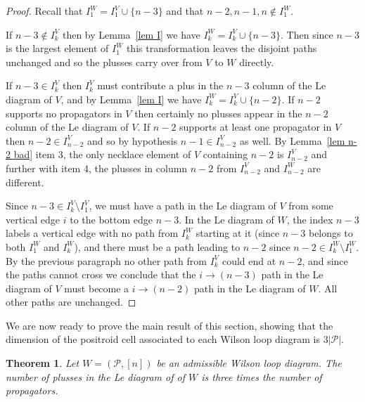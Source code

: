 \documentclass[11pt]{article}
\newcommand{\cP}{\mathcal{P}}
\newtheorem{thm}{Theorem}[section]
\theoremstyle{remark}
\theoremstyle{definition}
\begin{document}
\begin{proof}
Recall that $I_1^W = I_1^V\cup \{n-3\}$ and that $n-2,n-1,n \not\in I_1^W$.

  If $n-3\not\in I_{k}^{V}$ then by Lemma~\ref{lem I} we have $I_{k}^{W} = I_k^{V}\cup \{n-3\}$.  Then since $n-3$ is the largest element of $I_1^{W}$ this transformation leaves the disjoint paths unchanged and so the plusses carry over from $V$ to $W$ directly.

  If $n-3\in I_{k}^{V}$ then $I_k^V$ must contribute a plus in the $n-3$ column of the Le diagram of $V$, and by Lemma~\ref{lem I} we have $I_{k}^{W} = I_k^{V}\cup \{n-2\}$. If $n-2$ supports no propagators in $V$ then certainly no plusses appear in the $n-2$ column of the Le diagram of $V$. If $n-2$ supports at least one propagator in $V$ then $n-2 \in I_{n-2}^V$ and so by hypothesis $n-1 \in I_{n-2}^V$ as well. By Lemma~\ref{lem n-2 bad} item 3, the only necklace element of $V$ containing $n-2$ is $I_{n-2}^{V}$ and further with item 4, the plusses in column $n-2$ from $I_{n-2}^V$ and $I_{n-2}^W$ are different.

  Since $n-3 \in I_k^V \setminus I_1^V$, we must have a path in the Le diagram of $V$ from some vertical edge $i$ to the bottom edge $n-3$.  In the Le diagram of $W$, the index $n-3$ labels a vertical edge with no path from $I_k^W$ starting at it (since $n-3$ belongs to both $I_1^W$ and $I_k^W$), and there must be a path leading to $n-2$ since $n-2 \in I_k^W \setminus I_1^W$.  By the previous paragraph no other path from $I_k^V$ could end at $n-2$, and since the paths cannot cross we conclude that the $i\rightarrow (n-3)$ path in the Le diagram of $V$ must become a $i\rightarrow (n-2)$ path in the Le diagram of $W$. All other paths are unchanged.
\end{proof}

We are now ready to prove the main result of this section, showing that the dimension of the positroid cell associated to each Wilson loop diagram is $3|\cP|$. 

\begin{thm}\label{thm dim}
Let $W = (\cP, [n])$ be an admissible Wilson loop diagram.  The number of plusses in the Le diagram of of $W$ is three times the number of propagators.
\end{thm}
\end{document}
